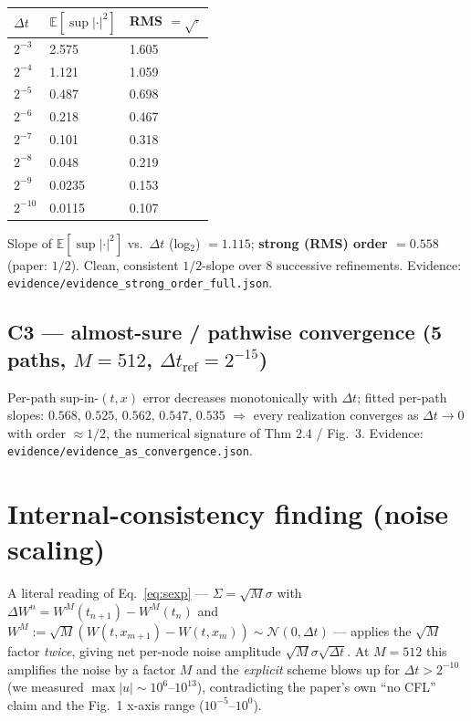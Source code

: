 \documentclass[11pt]{article}
\begin{document}
\begin{center}
\begin{tabular}{lll}
\toprule
$\Delta t$ & $\mathbb{E}[\sup|\cdot|^2]$ & RMS $=\sqrt{\cdot}$ \\
\midrule
$2^{-3}$  & 2.575  & 1.605 \\
$2^{-4}$  & 1.121  & 1.059 \\
$2^{-5}$  & 0.487  & 0.698 \\
$2^{-6}$  & 0.218  & 0.467 \\
$2^{-7}$  & 0.101  & 0.318 \\
$2^{-8}$  & 0.048  & 0.219 \\
$2^{-9}$  & 0.0235 & 0.153 \\
$2^{-10}$ & 0.0115 & 0.107 \\
\bottomrule
\end{tabular}
\end{center}

Slope of $\mathbb{E}[\sup|\cdot|^2]$ vs.\ $\Delta t$ (log$_2$) $=1.115$; \textbf{strong (RMS)
order $=0.558$} (paper: $1/2$). Clean, consistent $1/2$-slope over 8 successive refinements.
Evidence: \texttt{evidence/evidence\_strong\_order\_full.json}.

\subsection*{C3 --- almost-sure / pathwise convergence (5 paths, $M=512$, $\Delta t_{\text{ref}}=2^{-15}$)}

Per-path sup-in-$(t,x)$ error decreases monotonically with $\Delta t$; fitted per-path slopes:
$0.568,\,0.525,\,0.562,\,0.547,\,0.535$ $\Rightarrow$ every realization converges as
$\Delta t\!\to\!0$ with order $\approx 1/2$, the numerical signature of Thm 2.4 / Fig.\ 3.
Evidence: \texttt{evidence/evidence\_as\_convergence.json}.

\section{Internal-consistency finding (noise scaling)}

A literal reading of Eq.\ \eqref{eq:sexp} --- $\Sigma=\sqrt{M}\sigma$ with
$\Delta W^n = W^M(t_{n+1})-W^M(t_n)$ and
$W^M := \sqrt{M}(W(t,x_{m+1})-W(t,x_m))\sim \mathcal{N}(0,\Delta t)$ --- applies the
$\sqrt{M}$ factor \emph{twice}, giving net per-node noise amplitude $\sqrt{M}\sigma\sqrt{\Delta t}$.
At $M=512$ this amplifies the noise by a factor $M$ and the \emph{explicit} scheme blows up for
$\Delta t > 2^{-10}$ (we measured $\max|u|\sim 10^{6}\text{--}10^{13}$), contradicting the
paper's own ``no CFL'' claim and the Fig.\ 1 x-axis range ($10^{-5}\text{--}10^{0}$).
\end{document}
